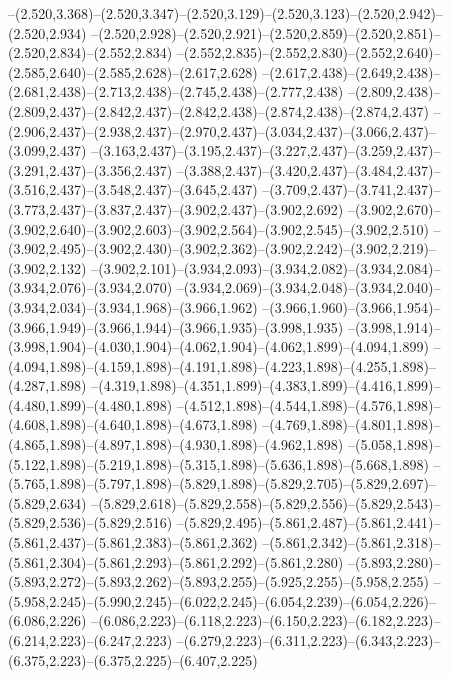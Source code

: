   --(2.520,3.368)--(2.520,3.347)--(2.520,3.129)--(2.520,3.123)--(2.520,2.942)--(2.520,2.934)%
  --(2.520,2.928)--(2.520,2.921)--(2.520,2.859)--(2.520,2.851)--(2.520,2.834)--(2.552,2.834)%
  --(2.552,2.835)--(2.552,2.830)--(2.552,2.640)--(2.585,2.640)--(2.585,2.628)--(2.617,2.628)%
  --(2.617,2.438)--(2.649,2.438)--(2.681,2.438)--(2.713,2.438)--(2.745,2.438)--(2.777,2.438)%
  --(2.809,2.438)--(2.809,2.437)--(2.842,2.437)--(2.842,2.438)--(2.874,2.438)--(2.874,2.437)%
  --(2.906,2.437)--(2.938,2.437)--(2.970,2.437)--(3.034,2.437)--(3.066,2.437)--(3.099,2.437)%
  --(3.163,2.437)--(3.195,2.437)--(3.227,2.437)--(3.259,2.437)--(3.291,2.437)--(3.356,2.437)%
  --(3.388,2.437)--(3.420,2.437)--(3.484,2.437)--(3.516,2.437)--(3.548,2.437)--(3.645,2.437)%
  --(3.709,2.437)--(3.741,2.437)--(3.773,2.437)--(3.837,2.437)--(3.902,2.437)--(3.902,2.692)%
  --(3.902,2.670)--(3.902,2.640)--(3.902,2.603)--(3.902,2.564)--(3.902,2.545)--(3.902,2.510)%
  --(3.902,2.495)--(3.902,2.430)--(3.902,2.362)--(3.902,2.242)--(3.902,2.219)--(3.902,2.132)%
  --(3.902,2.101)--(3.934,2.093)--(3.934,2.082)--(3.934,2.084)--(3.934,2.076)--(3.934,2.070)%
  --(3.934,2.069)--(3.934,2.048)--(3.934,2.040)--(3.934,2.034)--(3.934,1.968)--(3.966,1.962)%
  --(3.966,1.960)--(3.966,1.954)--(3.966,1.949)--(3.966,1.944)--(3.966,1.935)--(3.998,1.935)%
  --(3.998,1.914)--(3.998,1.904)--(4.030,1.904)--(4.062,1.904)--(4.062,1.899)--(4.094,1.899)%
  --(4.094,1.898)--(4.159,1.898)--(4.191,1.898)--(4.223,1.898)--(4.255,1.898)--(4.287,1.898)%
  --(4.319,1.898)--(4.351,1.899)--(4.383,1.899)--(4.416,1.899)--(4.480,1.899)--(4.480,1.898)%
  --(4.512,1.898)--(4.544,1.898)--(4.576,1.898)--(4.608,1.898)--(4.640,1.898)--(4.673,1.898)%
  --(4.769,1.898)--(4.801,1.898)--(4.865,1.898)--(4.897,1.898)--(4.930,1.898)--(4.962,1.898)%
  --(5.058,1.898)--(5.122,1.898)--(5.219,1.898)--(5.315,1.898)--(5.636,1.898)--(5.668,1.898)%
  --(5.765,1.898)--(5.797,1.898)--(5.829,1.898)--(5.829,2.705)--(5.829,2.697)--(5.829,2.634)%
  --(5.829,2.618)--(5.829,2.558)--(5.829,2.556)--(5.829,2.543)--(5.829,2.536)--(5.829,2.516)%
  --(5.829,2.495)--(5.861,2.487)--(5.861,2.441)--(5.861,2.437)--(5.861,2.383)--(5.861,2.362)%
  --(5.861,2.342)--(5.861,2.318)--(5.861,2.304)--(5.861,2.293)--(5.861,2.292)--(5.861,2.280)%
  --(5.893,2.280)--(5.893,2.272)--(5.893,2.262)--(5.893,2.255)--(5.925,2.255)--(5.958,2.255)%
  --(5.958,2.245)--(5.990,2.245)--(6.022,2.245)--(6.054,2.239)--(6.054,2.226)--(6.086,2.226)%
  --(6.086,2.223)--(6.118,2.223)--(6.150,2.223)--(6.182,2.223)--(6.214,2.223)--(6.247,2.223)%
  --(6.279,2.223)--(6.311,2.223)--(6.343,2.223)--(6.375,2.223)--(6.375,2.225)--(6.407,2.225)%
